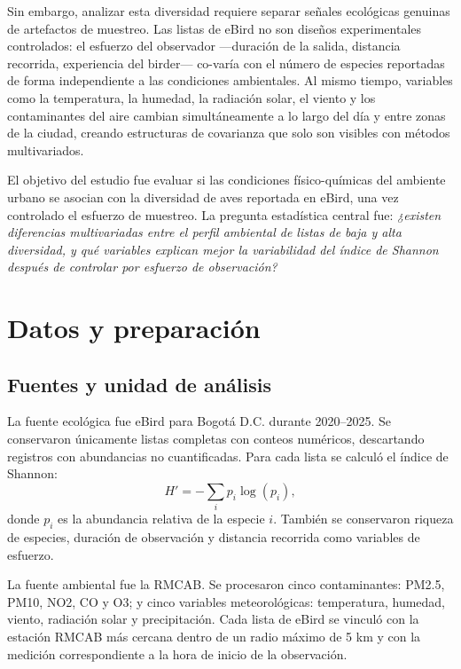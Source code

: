 \documentclass[9pt,letterpaper]{article}
\begin{document}
Sin embargo, analizar esta diversidad requiere separar señales ecológicas genuinas de artefactos de muestreo. Las listas de eBird no son diseños experimentales controlados: el esfuerzo del observador ---duración de la salida, distancia recorrida, experiencia del birder--- co-varía con el número de especies reportadas de forma independiente a las condiciones ambientales. Al mismo tiempo, variables como la temperatura, la humedad, la radiación solar, el viento y los contaminantes del aire cambian simultáneamente a lo largo del día y entre zonas de la ciudad, creando estructuras de covarianza que solo son visibles con métodos multivariados.

El objetivo del estudio fue evaluar si las condiciones físico-químicas del ambiente urbano se asocian con la diversidad de aves reportada en eBird, una vez controlado el esfuerzo de muestreo. La pregunta estadística central fue: \textit{¿existen diferencias multivariadas entre el perfil ambiental de listas de baja y alta diversidad, y qué variables explican mejor la variabilidad del índice de Shannon después de controlar por esfuerzo de observación?}

\section{Datos y preparación}

\subsection{Fuentes y unidad de análisis}

La fuente ecológica fue eBird para Bogotá D.C. durante 2020--2025. Se conservaron únicamente listas completas con conteos numéricos, descartando registros con abundancias no cuantificadas. Para cada lista se calculó el índice de Shannon:
\[
H'=-\sum_i p_i\log(p_i),
\]
donde $p_i$ es la abundancia relativa de la especie $i$. También se conservaron riqueza de especies, duración de observación y distancia recorrida como variables de esfuerzo.

La fuente ambiental fue la RMCAB. Se procesaron cinco contaminantes: PM2.5, PM10, NO2, CO y O3; y cinco variables meteorológicas: temperatura, humedad, viento, radiación solar y precipitación. Cada lista de eBird se vinculó con la estación RMCAB más cercana dentro de un radio máximo de 5 km y con la medición correspondiente a la hora de inicio de la observación.
\end{document}
